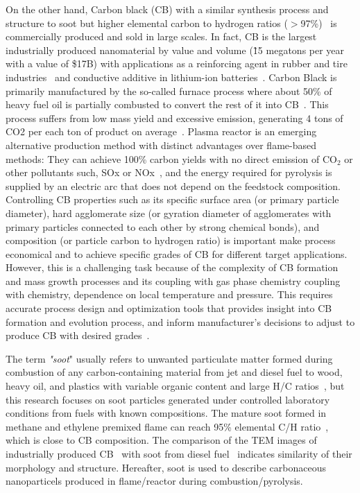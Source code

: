On the other hand, Carbon black (CB) with a similar synthesis process and structure to soot but higher elemental carbon to hydrogen ratios ($>$97\%)~\citep{watson2001carbon} is commercially produced and sold in large scales. In fact, CB is the largest industrially produced nanomaterial by value and volume (\~15 megatons per year with a value of \$17B) with applications as a reinforcing agent in rubber and tire industries~\citep{international2016carbon} and conductive additive in lithium-ion batteries~\citep{Palomares2010}. Carbon Black is primarily manufactured by the so-called furnace process where about 50\% of heavy fuel oil is partially combusted to convert the rest of it into CB~\citep{pratsinis2011history}. This process suffers from low mass yield and excessive emission, generating 4 tons of CO2 per each ton of product on average~\citep{bansal1993carbon}. Plasma reactor is an emerging alternative production method with distinct advantages over flame-based methods: They can achieve 100\% carbon yields with no direct emission of $\mathrm{CO_2}$ or other pollutants such, SOx or NOx~\citep{cho2004conversion}, and the energy required for pyrolysis is supplied by an electric arc that does not depend on the feedstock composition. Controlling CB properties such as its specific surface area (or primary particle diameter), hard agglomerate size (or gyration diameter of agglomerates with primary particles connected to each other by strong chemical bonds), and composition (or particle carbon to hydrogen ratio) is important make process economical and to achieve specific grades of CB for different target applications. However, this is a challenging task because of the complexity of CB formation and mass growth processes and its coupling with gas phase chemistry coupling with chemistry, dependence on local temperature and pressure. This requires accurate process design and optimization tools that provides insight into CB formation and evolution process, and inform manufacturer's decisions to adjust to produce CB with desired grades~\citep{park2005influence}.
 
The term \textit{"soot}" usually refers to unwanted particulate matter formed during combustion of any carbon-containing material from jet and diesel fuel to wood, heavy oil, and plastics with variable organic content and large H/C ratios~\citep{watson2001carbon}, but this research focuses on soot particles generated under controlled laboratory conditions from fuels with known compositions. The mature soot formed in methane and ethylene premixed flame can reach 95\% elemental C/H ratio~\cite{russo2015dehydrogenation}, which is close to CB composition. The comparison of the TEM images of industrially produced CB~\citep{singh2018nanostructure} with soot from diesel fuel~\citep{vander2007hrtem, lapuerta2017morphological} indicates similarity of their morphology and structure. Hereafter, soot is used to describe carbonaceous nanoparticels produced in flame/reactor during combustion/pyrolysis.

